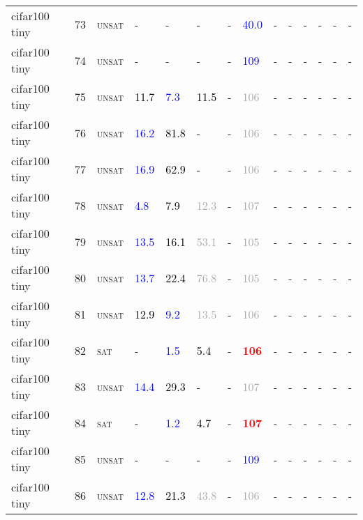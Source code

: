 \begin{center}
{\begin{longtable}{@{}llllllllllllll@{}}
cifar100 tiny & 73 & \textsc{unsat} & - & - & - & - & \textcolor{blue}{40.0} & - & - & - & - & - & - \\
cifar100 tiny & 74 & \textsc{unsat} & - & - & - & - & \textcolor{blue}{109} & - & - & - & - & - & - \\
cifar100 tiny & 75 & \textsc{unsat} & \textcolor{black}{11.7} & \textcolor{blue}{7.3} & \textcolor{black}{11.5} & - & \textcolor{darkgray}{106} & - & - & - & - & - & - \\
cifar100 tiny & 76 & \textsc{unsat} & \textcolor{blue}{16.2} & \textcolor{black}{81.8} & - & - & \textcolor{darkgray}{106} & - & - & - & - & - & - \\
cifar100 tiny & 77 & \textsc{unsat} & \textcolor{blue}{16.9} & \textcolor{black}{62.9} & - & - & \textcolor{darkgray}{106} & - & - & - & - & - & - \\
cifar100 tiny & 78 & \textsc{unsat} & \textcolor{blue}{4.8} & \textcolor{black}{7.9} & \textcolor{darkgray}{12.3} & - & \textcolor{darkgray}{107} & - & - & - & - & - & - \\
cifar100 tiny & 79 & \textsc{unsat} & \textcolor{blue}{13.5} & \textcolor{black}{16.1} & \textcolor{darkgray}{53.1} & - & \textcolor{darkgray}{105} & - & - & - & - & - & - \\
cifar100 tiny & 80 & \textsc{unsat} & \textcolor{blue}{13.7} & \textcolor{black}{22.4} & \textcolor{darkgray}{76.8} & - & \textcolor{darkgray}{105} & - & - & - & - & - & - \\
cifar100 tiny & 81 & \textsc{unsat} & \textcolor{black}{12.9} & \textcolor{blue}{9.2} & \textcolor{darkgray}{13.5} & - & \textcolor{darkgray}{106} & - & - & - & - & - & - \\
cifar100 tiny & 82 & \textsc{sat} & - & \textcolor{blue}{1.5} & \textcolor{black}{5.4} & - & \textbf{\textcolor{red}{106}} & - & - & - & - & - & - \\
cifar100 tiny & 83 & \textsc{unsat} & \textcolor{blue}{14.4} & \textcolor{black}{29.3} & - & - & \textcolor{darkgray}{107} & - & - & - & - & - & - \\
cifar100 tiny & 84 & \textsc{sat} & - & \textcolor{blue}{1.2} & \textcolor{black}{4.7} & - & \textbf{\textcolor{red}{107}} & - & - & - & - & - & - \\
cifar100 tiny & 85 & \textsc{unsat} & - & - & - & - & \textcolor{blue}{109} & - & - & - & - & - & - \\
cifar100 tiny & 86 & \textsc{unsat} & \textcolor{blue}{12.8} & \textcolor{black}{21.3} & \textcolor{darkgray}{43.8} & - & \textcolor{darkgray}{106} & - & - & - & - & - & - \\

\end{longtable}}
\end{center}
